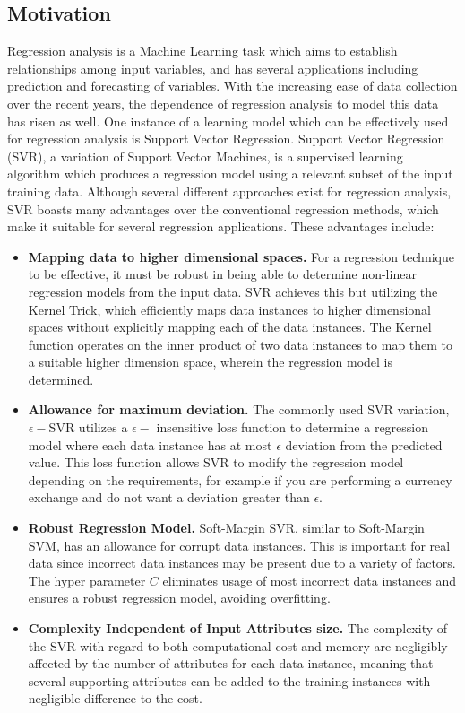 \documentclass[12pt]{article}
\begin{document}
\subsection{Motivation}
Regression analysis is a Machine Learning task which aims to establish relationships among input variables, and has several applications including prediction and forecasting of variables. With the increasing ease of data collection over the recent years, the dependence of regression analysis to model this data has risen as well. One instance of a learning model which can be effectively used for regression analysis is Support Vector Regression.
\newline\newline
Support Vector Regression (SVR), a variation of Support Vector Machines, is a supervised learning algorithm which produces a regression model using a relevant subset of the input training data. Although several different approaches exist for regression analysis, SVR boasts many advantages over the conventional regression methods, which make it suitable for several regression applications. These advantages include:
\begin{itemize}
\item {\bf Mapping data to higher dimensional spaces.}
For a regression technique to be effective, it must be robust in being able to determine non-linear regression models from the input data.
SVR achieves this but utilizing the Kernel Trick, which efficiently maps data instances to higher dimensional spaces without explicitly mapping each of the data instances. The Kernel function operates on the inner product of two data instances to map them to a suitable higher dimension space, wherein the regression model is determined.
\item {\bf Allowance for maximum deviation.}
The commonly used SVR variation, $\epsilon-$SVR utilizes a $\epsilon-$ insensitive loss function to determine a regression model where each data instance has at most $\epsilon$ deviation from the predicted value. This loss function allows SVR to modify the regression model depending on the requirements, for example if you are performing a currency exchange and do not want a deviation greater than $\epsilon$.
\item {\bf Robust Regression Model.}
Soft-Margin SVR, similar to Soft-Margin SVM, has an allowance for corrupt data instances. This is important for real data since incorrect data instances may be present due to a variety of factors. The hyper parameter $C$ eliminates usage of most incorrect data instances and ensures a robust regression model, avoiding overfitting.
\item  {\bf Complexity Independent of Input Attributes size.}
The complexity of the SVR with regard to both computational cost and memory are negligibly affected by the number of attributes for each data instance, meaning that several supporting attributes can be added to the training instances with negligible difference to the cost.
\end{itemize}
\end{document}
